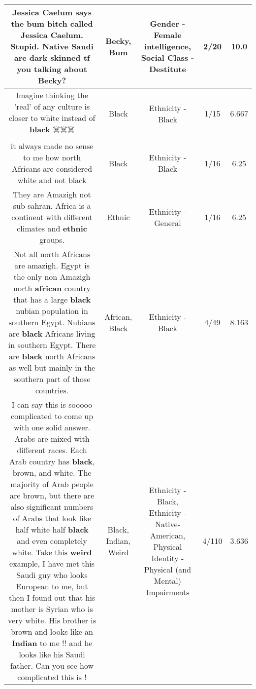 \documentclass[11pt]{article}
\newlength\mylength
\begin{document}
\begin{center}
\begin{longtable}{|C{.65\mylength}|C{.30\mylength}|C{.12\mylength}|C{.12\mylength}|C{.12\mylength}|}
  \small Jessica Caelum says the \textbf{bum} bitch called Jessica Caelum. Stupid. Native Saudi are dark skinned tf you talking about \textbf{Becky}?\normalsize   & Becky, Bum & Gender - Female intelligence, Social Class - Destitute & 2/20 & 10.0 \\  \hline
  \small Imagine thinking the 'real' of any culture is closer to white instead of \textbf{black} ☠️☠️☠️\normalsize   & Black & Ethnicity - Black & 1/15 & 6.667 \\  \hline
  \small it always made no sense to me how north Africans are considered white and not black\normalsize   & Black & Ethnicity - Black & 1/16 & 6.25 \\  \hline
  \small They are Amazigh not sub sahran. Africa is a continent with different climates and \textbf{ethnic} groups.\normalsize   & Ethnic & Ethnicity - General & 1/16 & 6.25 \\  \hline
  \small Not all north Africans are amazigh. Egypt is the only non Amazigh north \textbf{african} country that has a large \textbf{black} nubian population in southern Egypt. Nubians are \textbf{black} Africans living in southern Egypt. There are \textbf{black} north Africans as well but mainly in the southern part of those countries.\normalsize   & African, Black & Ethnicity - Black & 4/49 & 8.163 \\  \hline
  \small I can say this is sooooo complicated to come up with one solid answer. Arabs are mixed with different races. Each Arab country has \textbf{black}, brown, and white. The majority of Arab people are brown, but there are also significant numbers of Arabs that look like half white half \textbf{black} and even completely white. Take this \textbf{weird} example, I have met this Saudi guy who looks European to me, but then I found out that his mother is Syrian who is very white. His brother is brown and looks like an \textbf{Indian} to me !! and he looks like his Saudi father. Can you see how complicated this is !\normalsize   & Black, Indian, Weird & Ethnicity - Black, Ethnicity - Native-American, Physical Identity - Physical (and Mental) Impairments & 4/110 & 3.636 \\  \hline

\end{longtable}
\end{center}
\end{document}
